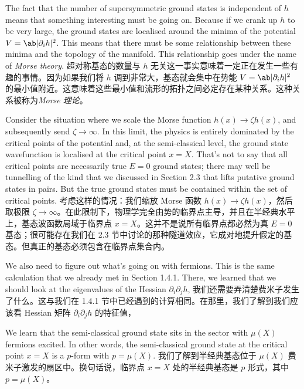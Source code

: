 \documentclass{ctexart}
\begin{document}
\begin{paracol}{2}
The fact that the number of supersymmetric ground states is independent of $h$ means that something interesting must be going on. Because if we crank up $h$ to be very large, the ground states are localised around the minima of the potential $V = \ab|\partial_i h|^2$. This means that there must be some relationship between these minima and the topology of the manifold. This relationship goes under the name of \textit{Morse theory}.
\switchcolumn
超对称基态的数量与 $h$ 无关这一事实意味着一定正在发生一些有趣的事情。因为如果我们将 $h$ 调到非常大，基态就会集中在势能 $V = \ab|\partial_i h|^2$ 的最小值附近。这意味着这些最小值和流形的拓扑之间必定存在某种关系。这种关系被称为\textit{Morse 理论}。
\switchcolumn*

Consider the situation where we scale the Morse function $h(x) \to \zeta h(x)$, and subsequently send $\zeta \to \infty$. In this limit, the physics is entirely dominated by the critical points of the potential and, at the semi-classical level, the ground state wavefunction is localised at the critical point $x = X$. That’s not to say that all critical points are necessarily true $E = 0$ ground states; there may well be tunnelling of the kind that we discussed in Section 2.3 that lifts putative ground states in pairs. But the true ground states must be contained within the set of critical points.
\switchcolumn
考虑这样的情况：我们缩放 Morse 函数 $h(x) \to \zeta h(x)$，然后取极限 $\zeta \to \infty$。在此限制下，物理学完全由势的临界点主导，并且在半经典水平上，基态波函数局域于临界点 $x = X$。这并不是说所有临界点都必然为真 $E = 0$ 基态；很可能存在我们在 2.3 节中讨论的那种隧道效应，它成对地提升假定的基态。但真正的基态必须包含在临界点集合内。
\switchcolumn*

We also need to figure out what’s going on with fermions. This is the same calculation that we already met in Section 1.4.1. There, we learned that we should look at the eigenvalues of the Hessian $\partial_i \partial_j h$,
\switchcolumn
我们还需要弄清楚费米子发生了什么。这与我们在 1.4.1 节中已经遇到的计算相同。在那里，我们了解到我们应该看 Hessian 矩阵 $\partial_i \partial_j h$ 的特征值，
\switchcolumn*

We learn that the semi-classical ground state sits in the sector with $\mu(X)$ fermions excited. In other words, the semi-classical ground state at the critical point $x = X$ is a $p$-form with $p = \mu(X)$.
\switchcolumn
我们了解到半经典基态位于 $\mu(X)$ 费米子激发的扇区中。换句话说，临界点 $x = X$ 处的半经典基态是 $p$ 形式，其中 $p = \mu(X)$。
\switchcolumn*


\end{paracol}
\end{document}
